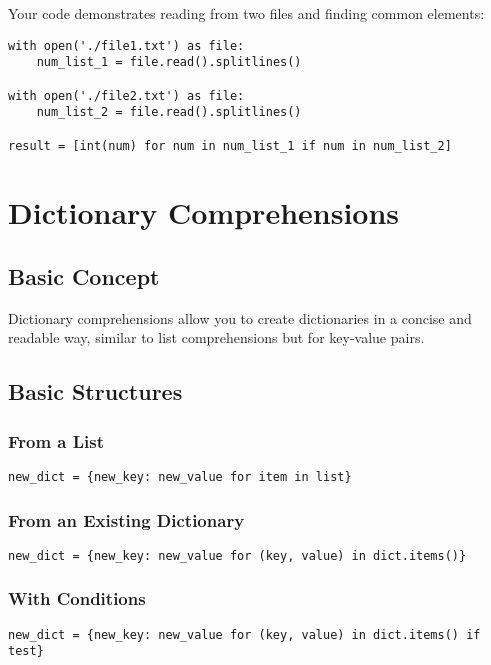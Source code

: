 \documentclass[12pt,a4paper]{article}
\begin{document}
Your code demonstrates reading from two files and finding common elements:
\begin{lstlisting}
with open('./file1.txt') as file:
    num_list_1 = file.read().splitlines()

with open('./file2.txt') as file:
    num_list_2 = file.read().splitlines()

result = [int(num) for num in num_list_1 if num in num_list_2]
\end{lstlisting}

\section{Dictionary Comprehensions}

\subsection{Basic Concept}

Dictionary comprehensions allow you to create dictionaries in a concise and readable way, similar to list comprehensions but for key-value pairs.

\subsection{Basic Structures}

\subsubsection{From a List}
\begin{center}
\texttt{new\_dict = \{new\_key: new\_value for item in list\}}
\end{center}

\subsubsection{From an Existing Dictionary}
\begin{center}
\texttt{new\_dict = \{new\_key: new\_value for (key, value) in dict.items()\}}
\end{center}

\subsubsection{With Conditions}
\begin{center}
\texttt{new\_dict = \{new\_key: new\_value for (key, value) in dict.items() if test\}}
\end{center}
\end{document}
